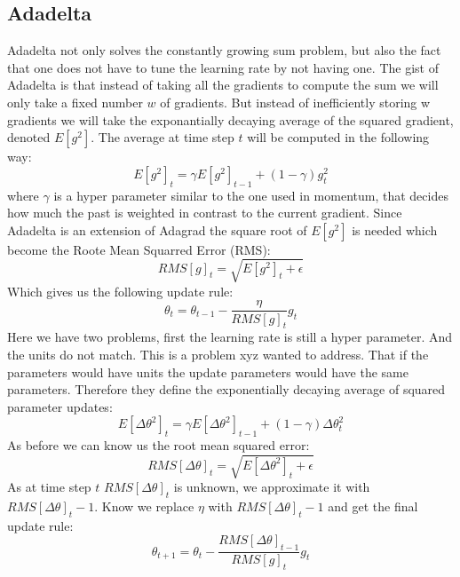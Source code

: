 {\subsection{Adadelta}\label{ssec:adadelta}
Adadelta \cite{adadelta} not only solves the constantly growing sum problem, but also the fact that one does not have to tune the learning rate by not having one. The gist of Adadelta is that instead of taking all the gradients to compute the sum we will only take a fixed number $w$ of gradients. But instead of inefficiently storing w gradients we will take the exponantially decaying average of the squared gradient, denoted $E[g^{2}]$. The average at time step $t$ will be computed in the following way: 
\begin{equation}
E[g^2]_t = \gamma E[g^2]_{t-1} + (1 - \gamma) g^2_t
\end{equation}
where $\gamma$ is a hyper parameter similar to the one used in momentum, that decides how much the past is weighted in contrast to the current gradient. Since Adadelta is an extension of Adagrad the square root of $E[g^{2}]$ is needed which become the Roote Mean Squarred Error (RMS):
\begin{equation}
RMS[g]_t = \sqrt{E[g^2]_t + \epsilon}
\end{equation}
Which gives us the following update rule: 
\begin{equation}
\theta_t = \theta_{t-1} - \frac{\eta}{RMS[g]_t}g_t
\end{equation}
Here we have two problems, first the learning rate is still a hyper parameter. And the units do not match. This is a problem xyz wanted to address. That if the parameters would have units the update parameters would have the same parameters. 
Therefore they define the exponentially decaying average of squared parameter updates: 
\begin{equation}
E[\Delta \theta^2]_t = \gamma E[\Delta \theta^2]_{t-1} + (1 - \gamma) \Delta \theta^2_t
\end{equation}
As before we can know us the root mean squared error: 
\begin{equation}
RMS[\Delta \theta]_{t} = \sqrt{E[\Delta \theta^2]_t + \epsilon}
\end{equation}
As at time step $t$ $RMS[\Delta \theta]_{t} $ is unknown, we approximate it with $ RMS[\Delta \theta]_{t}-1$. Know we replace $\eta$ with  $ RMS[\Delta \theta]_{t}-1$ and get the final update rule: 
\begin{equation}
 \theta_{t+1} = \theta_t - \dfrac{RMS[\Delta \theta]_{t-1}}{RMS[g]_{t}} g_{t}
\end{equation}
}
